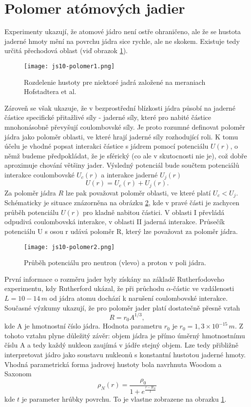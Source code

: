 \documentclass[../../main.tex]{subfiles}
\begin{document}
\section{Polomer atómových jadier}
Experimenty ukazují, že atomové jádro není ostře ohraničeno, ale že se hustota jaderné hmoty mění na povrchu jádra sice rychle, ale ne skokem. Existuje tedy určitá přechodová oblast (viď obrazok \ref{js10:polomer1}).
\begin{figure}[h]
 \centerline{\texttt{[image: js10-polomer1.png]}}
 \caption{Rozdelenie hustoty pre niektoré jadrá založené na meraniach Hofstadtera et al.}
 \label{js10:polomer1}
\end{figure}
\newline
Zároveň se však ukazuje, že v bezprostřední blízkosti jádra působí na jaderné částice specifické přitažlivé síly - jaderné síly, které pro nabité částice mnohonásobně převyšují coulombovské síly. Je proto rozumné definovat poloměr jádra jako poloměr oblasti, ve které hrají jaderné síly rozhodující roli. K tomu účelu je vhodné popsat interakci částice s jádrem pomocí potenciálu $U(r)$, o němž budeme předpokládat, že je sférický (co ale v skutocnosti nie je), což dobře aproximuje chování většiny jader. Výsledný potenciál bude součtem potenciálů interakce coulombovské $U_c(r)$ a interakce jaderné $U_j(r)$ 
\begin{equation} 
U(r)=U_c(r)+U_j(r).
\end{equation}
Za poloměr jádra $R$ lze pak považovat poloměr oblasti, ve které platí $U_c < U_j$. Schématicky je situace znázorněna na obrázku \ref{js10:polomer2}, kde v pravé části je zachycen průběh potenciálu $U(r)$ pro kladně nabitou částici. V oblasti I převládá odpudivá coulombovská interakce, v oblasti II jaderná interakce. Průsečík potenciálu U s osou r udává poloměr R, který lze považovat za poloměr jádra.
\begin{figure}[h]
 \centerline{\texttt{[image: js10-polomer2.png]}}
 \caption{Průběh potenciálu pro neutron (vlevo) a proton v poli jádra.}
 \label{js10:polomer2}
\end{figure}
\newline
První informace o rozměru jader byly získány na základě Rutherfodoveho experimentu, kdy Rutherford ukázal, že při průchodu $\alpha$-částic ve vzdálenosti $L=10-14\,m$ od jádra atomu dochází k narušení coulombovské interakce. Současné výzkumy ukazují, že pro poloměr jader platí dostatečně přesně vztah
$$ R=r_0A^{1/3}, $$
kde A je hmotnostní číslo jádra. Hodnota parametru $r_0$ je $r_0=1,3\times10^{-15}\,m$. Z tohoto vztahu plyne důležitý závěr: objem jádra je přímo úměrný hmotnostnímu číslu A a tedy každý nukleon zaujímá v jádře stejný objem. Lze tedy přibližně interpretovat jádro jako soustavu nukleonů s konstantní hustotou jaderné hmoty. Vhodná parametrická forma jadrovej hustoty bola navrhnuta Woodom a Saxonom 
$$ \rho_N(r)=\frac{\rho_0}{1+e^{\frac{r-R_N}{t}}} $$
kde $t$ je parameter hrúbky povrchu. To je vlastne zobrazene na obrazku \ref{js10:polomer1}.
\end{document}
